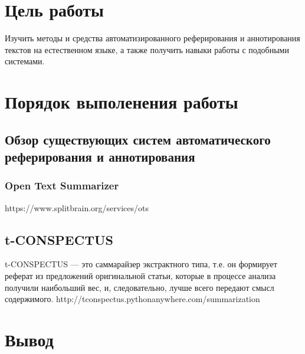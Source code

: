 	\section{Цель работы}
		Изучить методы и средства автоматизированного реферирования и аннотирования текстов на естественном языке, а также получить навыки работы с подобными системами.	
	\section{Порядок выполенения работы}
		\subsection{Обзор существующих систем автоматического реферирования и аннотирования}
			\subsubsection{Open Text Summarizer}
			https://www.splitbrain.org/services/ots	
			\subsection{t-CONSPECTUS}
			t-CONSPECTUS — это саммарайзер экстрактного типа, т.е. он формирует реферат из предложений оригинальной статьи, которые в процессе анализа получили наибольший вес, и, следовательно, лучше всего передают смысл содержимого.
			http://tconspectus.pythonanywhere.com/summarization
	\section{Вывод}